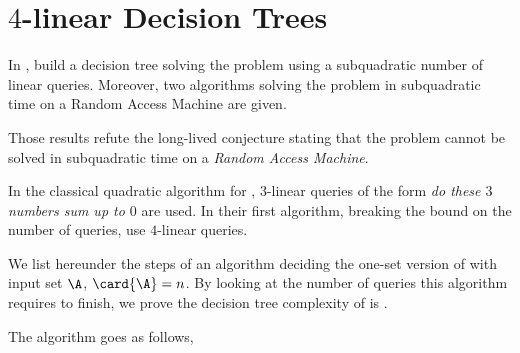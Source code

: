 \section{\(4\)-linear Decision Trees}

In \cite{gronlund:2014}, \citeauthor{gronlund:2014} build a decision tree
solving the \threeSUM problem using a subquadratic number of linear queries.
Moreover, two algorithms solving the \threeSUM problem in subquadratic time on
a Random Access Machine are
given.

Those results refute the long-lived conjecture stating that the \threeSUM problem
cannot be solved in subquadratic time on a \emph{Random Access Machine}.

In the classical quadratic algorithm for \threeSUM, $3$-linear queries of the
form \emph{do these $3$ numbers sum up to $0$} are used. In their first
algorithm, breaking the  bound on the number of queries,
\citeauthor{gronlund:2014} use $4$-linear queries.

We list hereunder the steps of an algorithm deciding the one-set
version of \threeSUM with input set $\A$, $\card{\A} = n$. By looking at the
number of queries this algorithm requires to finish, we prove the
decision tree complexity of \threeSUM is .

The algorithm goes as follows,

